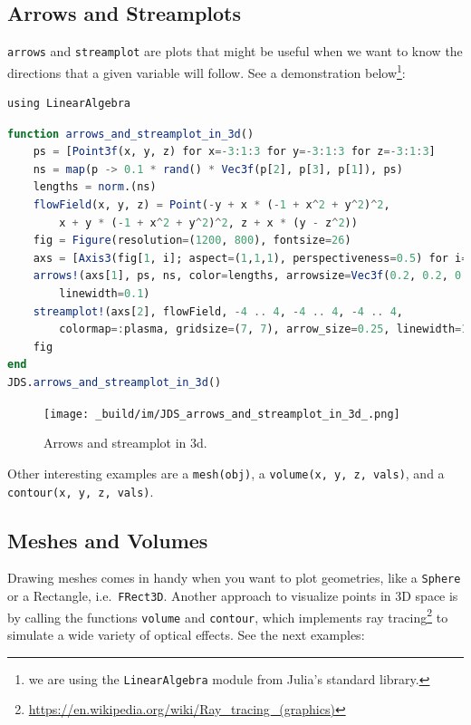 \documentclass[
  notoc %
]{tufte-book}
\DeclareRobustCommand{\href}[2]{#2\footnote{\url{#1}}}
\newcommand{\passthrough}[1]{#1}
\begin{document}
\hypertarget{arrows-and-streamplots}{%
\subsection{Arrows and Streamplots}\label{arrows-and-streamplots}}

\passthrough{\lstinline!arrows!} and
\passthrough{\lstinline!streamplot!} are plots that might be useful when
we want to know the directions that a given variable will follow. See a
demonstration below\footnote{we are using the
  \passthrough{\lstinline!LinearAlgebra!} module from Julia's standard
  library.}:

\begin{lstlisting}
using LinearAlgebra
\end{lstlisting}

\begin{lstlisting}[language=Julia]
function arrows_and_streamplot_in_3d()
    ps = [Point3f(x, y, z) for x=-3:1:3 for y=-3:1:3 for z=-3:1:3]
    ns = map(p -> 0.1 * rand() * Vec3f(p[2], p[3], p[1]), ps)
    lengths = norm.(ns)
    flowField(x, y, z) = Point(-y + x * (-1 + x^2 + y^2)^2,
        x + y * (-1 + x^2 + y^2)^2, z + x * (y - z^2))
    fig = Figure(resolution=(1200, 800), fontsize=26)
    axs = [Axis3(fig[1, i]; aspect=(1,1,1), perspectiveness=0.5) for i=1:2]
    arrows!(axs[1], ps, ns, color=lengths, arrowsize=Vec3f(0.2, 0.2, 0.3),
        linewidth=0.1)
    streamplot!(axs[2], flowField, -4 .. 4, -4 .. 4, -4 .. 4,
        colormap=:plasma, gridsize=(7, 7), arrow_size=0.25, linewidth=1)
    fig
end
JDS.arrows_and_streamplot_in_3d()
\end{lstlisting}

\begin{figure}
\hypertarget{fig:arrows_and_streamplot_in_3d}{%
\centering
\texttt{[image: \_build/im/JDS\_arrows\_and\_streamplot\_in\_3d\_.png]}
\caption{Arrows and streamplot in
3d.}\label{fig:arrows_and_streamplot_in_3d}
}
\end{figure}

Other interesting examples are a \passthrough{\lstinline!mesh(obj)!}, a
\passthrough{\lstinline!volume(x, y, z, vals)!}, and a
\passthrough{\lstinline!contour(x, y, z, vals)!}.

\hypertarget{meshes-and-volumes}{%
\subsection{Meshes and Volumes}\label{meshes-and-volumes}}

Drawing meshes comes in handy when you want to plot geometries, like a
\passthrough{\lstinline!Sphere!} or a Rectangle,
i.e.~\passthrough{\lstinline!FRect3D!}. Another approach to visualize
points in 3D space is by calling the functions
\passthrough{\lstinline!volume!} and \passthrough{\lstinline!contour!},
which implements
\href{https://en.wikipedia.org/wiki/Ray_tracing_(graphics)}{ray tracing}
to simulate a wide variety of optical effects. See the next examples:
\end{document}
